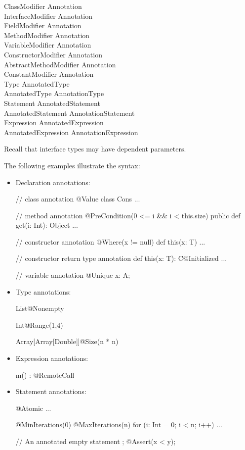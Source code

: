 \begin{grammar}
ClassModifier \: Annotation \\
InterfaceModifier \: Annotation \\
FieldModifier \: Annotation \\
MethodModifier \: Annotation \\
VariableModifier \: Annotation \\
ConstructorModifier \: Annotation \\
AbstractMethodModifier \: Annotation \\
ConstantModifier \: Annotation \\
Type \: AnnotatedType \\
AnnotatedType \: Annotation\plus Type \\
Statement \: AnnotatedStatement \\
AnnotatedStatement \: Annotation\plus Statement \\
Expression \: AnnotatedExpression \\
AnnotatedExpression \: Annotation\plus Expression \\
\end{grammar}

\noindent
Recall that interface types may have dependent parameters.

\noindent
The following examples illustrate the syntax:

\begin{itemize}
\item Declaration annotations:
\begin{xtennoindent}
  // class annotation
  @Value
  class Cons { ... }

  // method annotation
  @PreCondition(0 <= i && i < this.size)
  public def get(i: Int): Object { ... }

  // constructor annotation
  @Where(x != null)
  def this(x: T) { ... }

  // constructor return type annotation
  def this(x: T): C@Initialized { ... }

  // variable annotation
  @Unique x: A;
\end{xtennoindent}
\item Type annotations:
\begin{xtennoindent}
  List@Nonempty

  Int@Range(1,4)

  Array[Array[Double]]@Size(n * n)
\end{xtennoindent}
\item Expression annotations:
\begin{xtennoindent}
  m() : @RemoteCall
\end{xtennoindent}
\item Statement annotations:
\begin{xtennoindent}
  @Atomic { ... }

  @MinIterations(0)
  @MaxIterations(n)
  for (i: Int = 0; i < n; i++) { ... }

  // An annotated empty statement ;
  @Assert(x < y);
\end{xtennoindent}
\end{itemize}

